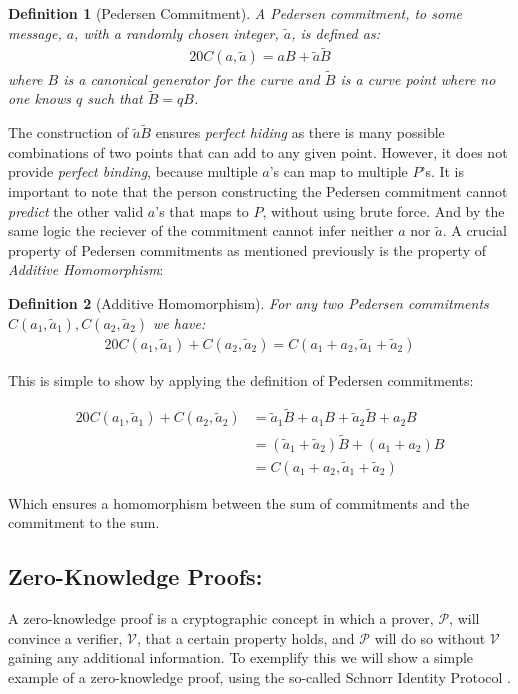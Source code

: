 \documentclass{article}
\newtheorem{definition}{Definition}[section]
\newcommand{\eq}[1]{\begin{alignat*}{20}#1\end{alignat*}}
\newcommand{\V}{\mathcal{V}}
\renewcommand{\P}{\mathcal{P}}
\newcommand{\blind}[1]{\widetilde{#1}}
\newcommand{\ba}{\blind{a}}
\newcommand{\bB}{\blind{B}}
\begin{document}
\begin{definition}[Pedersen Commitment]
	A Pedersen commitment, to some message, $a$, with a randomly chosen
	integer, $\ba$, is defined as:
	\eq{
		C(a, \ba) = aB + \ba\bB
	}
	where $B$ is a canonical generator for the curve and $\bB$
	is a curve point where no one knows $q$ such that $\bB = qB$.
\end{definition}

The construction of $\ba\bB$ ensures \textit{perfect hiding} as there
is many possible combinations of two points that can add to any given
point. However, it does not provide \textit{perfect binding}, because
multiple $a$'s can map to multiple $P$'s. It is important to note that
the person constructing the Pedersen commitment cannot \textit{predict}
the other valid $a$'s that maps to $P$, without using brute force. And
by the same logic the reciever of the commitment cannot infer neither
$a$ nor $\ba$. A crucial property of Pedersen commitments as mentioned
previously is the property of \textit{Additive Homomorphism}:

\begin{definition}[Additive Homomorphism] \label{pedersen-additive-homomorphism}
	For any two Pedersen commitments $C(a_1,\ba_1), C(a_2,\ba_2)$ we have:
	\eq{
		C(a_1,\ba_1) + C(a_2,\ba_2) = C(a_1 + a_2, \ba_1 + \ba_2)
	}
\end{definition}

This is simple to show by applying the definition of Pedersen
commitments: 

\eq{
	C(a_1,\ba_1) + C(a_2,\ba_2) &= \ba_1\bB + a_1B  + \ba_2\bB + a_2B \\
	                            &= (\ba_1 + \ba_2)\bB + (a_1 + a_2)B \\
	                            &= C(a_1 + a_2, \ba_1 + \ba_2)
}

Which ensures a homomorphism between the sum of commitments and the
commitment to the sum.

\subsection{Zero-Knowledge Proofs:}\label{zero-knowledge-proofs}

A zero-knowledge proof is a cryptographic concept in which a prover,
$\P$, will convince a verifier, $\V$, that a certain property
holds, and $\P$ will do so without $\V$ gaining any additional
information. To exemplify this we will show a simple example of
a zero-knowledge proof, using the so-called Schnorr Identity Protocol
\cite{zkdocs-schnorr}.
\end{document}
